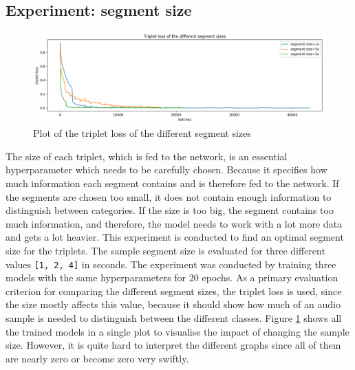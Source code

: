 \subsection{Experiment: segment size}
\label{sub:Experiment-Segment-Size}
\begin{figure}[hb]
\centering
    \includegraphics[width=0.95\linewidth]{img/experiment_segment_size_triplet_loss_all.png}
    \caption{Plot of the triplet loss of the different segment sizes}
    \label{fig:tile-size-plot}
\end{figure}
\noindent
The size of each triplet, which is fed to the network, is an essential hyperparameter which needs to be carefully chosen. Because it specifies how much information each segment contains and is therefore fed to the network. If the segments are chosen too small, it does not contain enough information to distinguish between categories. If the size is too big, the segment contains too much information, and therefore, the model needs to work with a lot more data and gets a lot heavier. This experiment is conducted to find an optimal segment size for the triplets. The sample segment size is evaluated for three different values \texttt{[1, 2, 4]} in seconds.
\newline
\newline
The experiment was conducted by training three models with the same hyperparameters for 20 epochs. As a primary evaluation criterion for comparing the different segment sizes, the triplet loss is used, since the size mostly affects this value, because it should show how much of an audio sample is needed to distinguish between the different classes. Figure \ref{fig:tile-size-plot} shows all the trained models in a single plot to visualise the impact of changing the sample size. However, it is quite hard to interpret the different graphs since all of them are nearly zero or become zero very swiftly.
\newline
\newline
